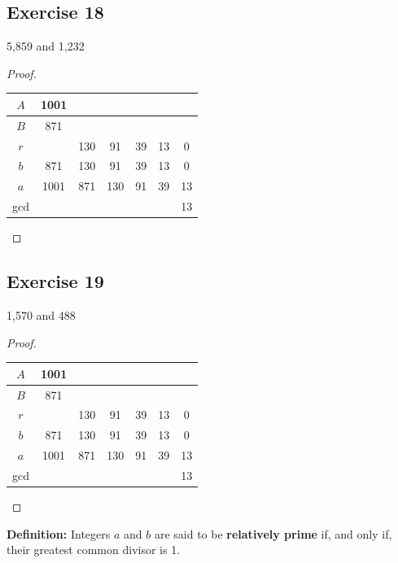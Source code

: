\documentclass[14pt]{extarticle}
\newcommand{\cy}{\color{cyan}}
\begin{document}
\subsection{Exercise 18}
5,859 and 1,232

\begin{proof}
\begin{center}
\begin{tabular}{|c|c|c|c|c|c|c|}
\hline
$A$ &1001 &     &    &    &    & \\
\hline
$B$ & 871 &     &    &    &    & \\
\hline
$r$ &     & 130 & 91 & 39 & 13 & 0 \\
\hline
$b$ & 871 & 130 & 91 & 39 & 13 & 0 \\
\hline
$a$ &1001 & 871 & 130& 91 & 39 & 13 \\
\hline
gcd &     &     &    &    &    & 13 \\
\hline
\end{tabular}
\end{center}
\end{proof}

\subsection{Exercise 19}
1,570 and 488

\begin{proof}
\begin{center}
\begin{tabular}{|c|c|c|c|c|c|c|}
\hline
$A$ &1001 &     &    &    &    & \\
\hline
$B$ & 871 &     &    &    &    & \\
\hline
$r$ &     & 130 & 91 & 39 & 13 & 0 \\
\hline
$b$ & 871 & 130 & 91 & 39 & 13 & 0 \\
\hline
$a$ &1001 & 871 & 130& 91 & 39 & 13 \\
\hline
gcd &     &     &    &    &    & 13 \\
\hline
\end{tabular}
\end{center}
\end{proof}

\begin{tcolorbox}[colframe=cyan]
{\bf \cy Definition:} Integers $a$ and $b$ are said to be {\bf relatively prime} if, and only if, their greatest common divisor is 1.
\end{tcolorbox}
\end{document}
